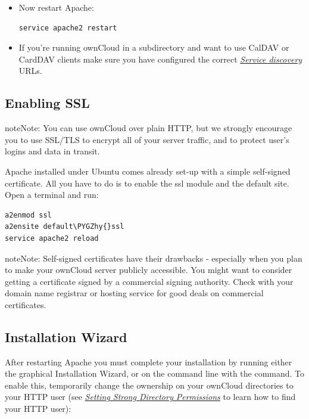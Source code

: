 \documentclass[letterpaper,10pt,english]{sphinxmanual}
\def\PYGZhy{\char`\-}
\begin{document}
\begin{itemize}
\item {} 
Now restart Apache:

\begin{Verbatim}[commandchars=\\\{\}]
service apache2 restart
\end{Verbatim}

\item {} 
If you're running ownCloud in a subdirectory and want to use CalDAV or
CardDAV clients make sure you have configured the correct
{\hyperref[issues/general_troubleshooting:service-discovery-label]{\emph{Service discovery}}} URLs.

\end{itemize}


\subsection{Enabling SSL}
\label{installation/source_installation:enabling-ssl-label}\label{installation/source_installation:enabling-ssl}
\begin{notice}{note}{Note:}
You can use ownCloud over plain HTTP, but we strongly encourage you to
use SSL/TLS to encrypt all of your server traffic, and to protect
user's logins and data in transit.
\end{notice}

Apache installed under Ubuntu comes already set-up with a simple
self-signed certificate. All you have to do is to enable the ssl module and
the default site. Open a terminal and run:

\begin{Verbatim}[commandchars=\\\{\}]
a2enmod ssl
a2ensite default\PYGZhy{}ssl
service apache2 reload
\end{Verbatim}

\begin{notice}{note}{Note:}
Self-signed certificates have their drawbacks - especially when you
plan to make your ownCloud server publicly accessible. You might want
to consider getting a certificate signed by a commercial signing
authority. Check with your domain name registrar or hosting service
for good deals on commercial certificates.
\end{notice}


\subsection{Installation Wizard}
\label{installation/source_installation:installation-wizard}\label{installation/source_installation:installation-wizard-label}
After restarting Apache you must complete your installation by running either
the graphical Installation Wizard, or on the command line with the 
command. To enable this, temporarily change the ownership on your ownCloud
directories to your HTTP user (see {\hyperref[installation/installation_wizard:strong-perms-label]{\emph{Setting Strong Directory Permissions}}} to learn how to
find your HTTP user):
\end{document}
